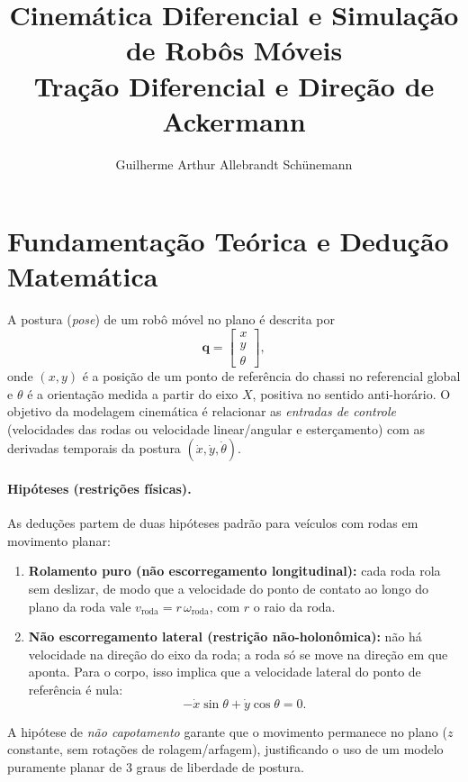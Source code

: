 \documentclass[11pt,a4paper]{article}
\title{\textbf{Cinemática Diferencial e Simulação de Robôs Móveis}\\[2pt]
\large Tração Diferencial e Direção de Ackermann}
\author{Guilherme Arthur Allebrandt Schünemann}
\date{}
\begin{document}
\maketitle

\section{Fundamentação Teórica e Dedução Matemática}

A postura (\emph{pose}) de um robô móvel no plano é descrita por
\begin{equation}
  \mathbf{q} = \begin{bmatrix} x \\ y \\ \theta \end{bmatrix},
\end{equation}
onde $(x,y)$ é a posição de um ponto de referência do chassi no
referencial global e $\theta$ é a orientação medida a partir do eixo $X$,
positiva no sentido anti-horário. O objetivo da modelagem cinemática é
relacionar as \emph{entradas de controle} (velocidades das rodas ou
velocidade linear/angular e esterçamento) com as derivadas temporais da
postura $(\dot{x},\dot{y},\dot{\theta})$.

\paragraph{Hipóteses (restrições físicas).} As deduções partem de duas
hipóteses padrão para veículos com rodas em movimento planar:
\begin{enumerate}
  \item \textbf{Rolamento puro (não escorregamento longitudinal):} cada
  roda rola sem deslizar, de modo que a velocidade do ponto de contato ao
  longo do plano da roda vale $v_{\text{roda}} = r\,\omega_{\text{roda}}$,
  com $r$ o raio da roda.
  \item \textbf{Não escorregamento lateral (restrição não-holonômica):} não
  há velocidade na direção do eixo da roda; a roda só se move na direção em
  que aponta. Para o corpo, isso implica que a velocidade lateral do ponto
  de referência é nula:
  \begin{equation}
    -\dot{x}\sin\theta + \dot{y}\cos\theta = 0.
    \label{eq:nonholo}
  \end{equation}
\end{enumerate}
A hipótese de \emph{não capotamento} garante que o movimento permanece no
plano ($z$ constante, sem rotações de rolagem/arfagem), justificando o uso
de um modelo puramente planar de 3 graus de liberdade de postura.
\end{document}
